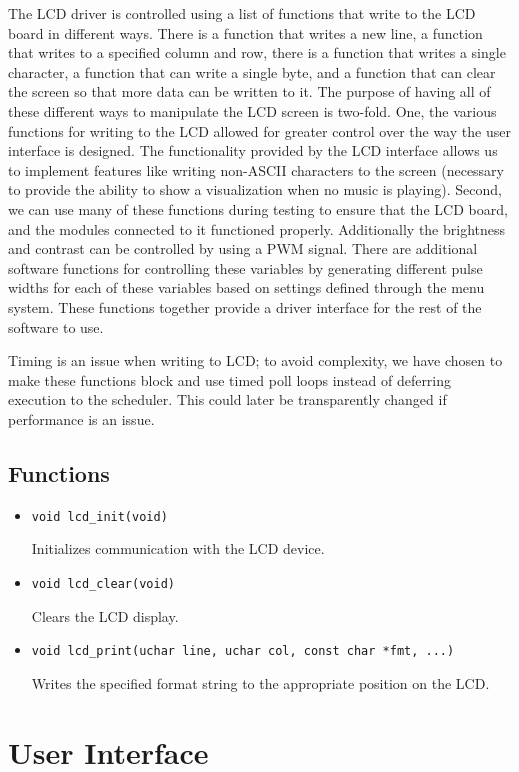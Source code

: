 The LCD driver is controlled using a list of functions that write to the LCD board in different ways. There is a function that writes a new line, a function that writes to a specified column and row, there is a function that writes a single character, a function that can write a single byte, and a function that can clear the screen so that more data can be written to it. The purpose of having all of these different ways to manipulate the LCD screen is two-fold. One, the various functions for writing to the LCD allowed for greater control over the way the user interface is designed. The functionality provided by the LCD interface allows us to implement features like writing non-ASCII characters to the screen (necessary to provide the ability to show a visualization when no music is playing). Second, we can use many of these functions during testing to ensure that the LCD board, and the modules connected to it functioned properly. Additionally the brightness and contrast can be controlled by using a PWM signal. There are additional software functions for controlling these variables by generating different pulse widths for each of these variables based on settings defined through the menu system. These functions together provide a driver interface for the rest of the software to use.

Timing is an issue when writing to LCD; to avoid complexity, we have chosen to make these functions block and use timed poll loops instead of deferring execution to the scheduler. This could later be transparently changed if performance is an issue.

\subsection*{Functions}
\begin{itemize}
\item \verb|void lcd_init(void)|

Initializes communication with the LCD device.

\item \verb|void lcd_clear(void)|

Clears the LCD display.

\item \verb|void lcd_print(uchar line, uchar col, const char *fmt, ...)|

Writes the specified format string to the appropriate position on the LCD.
\end{itemize}

\section{User Interface}
\label{sec:ui}

